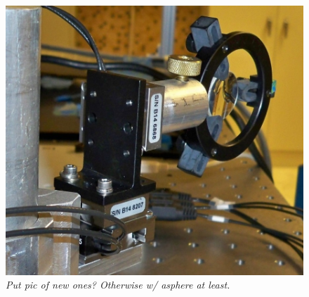 \begin{figure} %
        \centering
                \includegraphics[width=.5\textwidth]{figures/100_1885.JPG}
                \caption{\color{gray}\emph{Put pic of new ones? Otherwise w/ asphere at least.}}
\label{fig:laserStages}
\end{figure}
